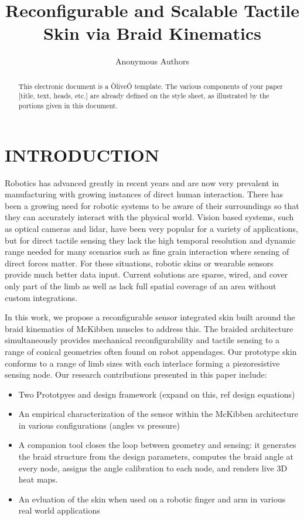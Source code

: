 \documentclass[letterpaper, 10 pt, conference]{ieeeconf}  %
\title{\LARGE \bf
Reconfigurable and Scalable Tactile Skin via Braid Kinematics
}
\author{Anonymous Authors}
\begin{document}
\maketitle
\thispagestyle{empty}
\pagestyle{empty}



\begin{abstract}

This electronic document is a ÒliveÓ template. The various components of your paper [title, text, heads, etc.] are already defined on the style sheet, as illustrated by the portions given in this document.

\end{abstract}


\section{INTRODUCTION}

Robotics has advanced greatly in recent years and are now very prevalent in manufacturing with growing instances of direct human interaction. There has been a growing need for robotic systems to be aware of their surroundings so that they can accurately interact with the physical world. Vision based systems, such as optical cameras and lidar, have been very popular for a variety of applications, but for direct tactile sensing they lack the high temporal resolution and dynamic range needed for many scenarios such as fine grain interaction where sensing of direct forces matter. For these situations, robotic skins or wearable sensors provide much better data input. Current solutions are sparse, wired, and cover only part of the limb as well as lack full spatial coverage of an area without custom integrations.


In this work, we propose a reconfigurable sensor integrated skin built around the braid kinematics of McKibben muscles to address this. The braided architecture simultaneously provides mechanical reconfigurability and tactile sensing to a range of conical geometries often found on robot appendages. Our prototype skin conforms to a range of limb sizes with each interlace forming a piezoresistive sensing node. Our research contributions presented in this paper include:

\begin{itemize}
    \item Two Prototpyes and design framework (expand on this, ref design equations)
    \item An empirical characterization of the sensor within the McKibben architecture in various configurations (angles vs pressure)
    \item A companion tool closes the loop between geometry and sensing: it generates the braid structure from the design parameters, computes the braid angle at every node, assigns the angle calibration to each node, and renders live 3D heat maps. 
    \item An evluation of the skin when used on a robotic finger and arm in various real world applications
\end{itemize}
\end{document}
